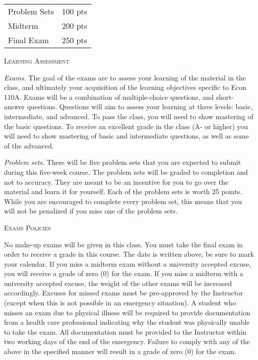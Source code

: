 \documentclass[11pt]{article}
\begin{document}
\medskip
\begin{tabular}{l r}
Problem Sets & 100 pts   \\
Midterm & 200 pts   \\
Final Exam & 250 pts 
\end{tabular}

\bigskip



\bigskip

\noindent\textsc{Learning Assessment}

\noindent \textit{Exams.} The goal of the exams are to assess your learning of the material in the class, and ultimately your acquisition of the learning objectives specific to Econ 110A. Exams will be a combination of multiple-choice questions, and short-answer questions. Questions will aim to assess your learning at three levels: basic, intermediate, and advanced. To pass the class, you will need to show mastering of the basic questions. To receive an excellent grade in the class (A- or higher) you will need to show mastering of basic and intermediate questions, as well as some of the advanced.

\bigskip

\noindent \textit{Problem sets.} There will be five problem sets that you are expected to submit during this five-week course. The problem sets will be graded to completion and not to accuracy. They are meant to be an incentive for you to go over the material and learn it for yourself. Each of the problem sets is worth 25 points. While you are encouraged to complete every problem set, this means that you will not be penalized if you miss one of the problem sets.

\bigskip

\noindent\textsc{Exams Policies }

\noindent No make-up exams will be given in this class. You must take
the final exam in order to receive a grade in this course. The date is written above,
be sure to mark your calendar. If you miss a midterm
exam without a university accepted excuse, you will receive a grade of zero (0)
for the exam. If you miss a midterm with a university accepted excuse,
the weight of the other exams will be increased accordingly. Excuses for missed exams must be pre-approved by the Instructor (except when this is not possible in an emergency situation). A student who misses an exam due to physical illness will be required to provide documentation from a health
care professional indicating why the student was physically unable to take
the exam. All documentation must be provided to the Instructor within two working days of the end of the emergency. Failure to comply with any of the above in the specified manner will result
in a grade of zero (0) for the exam.
\end{document}
